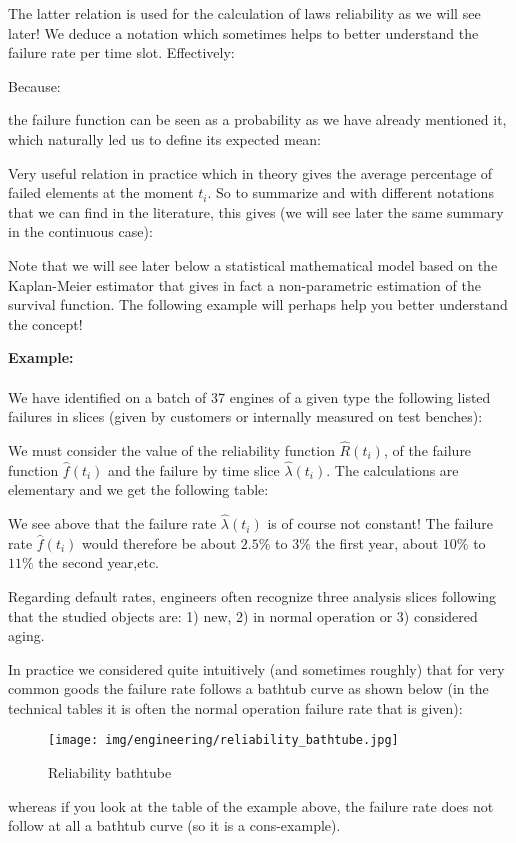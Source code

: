 	The latter relation is used for the calculation of laws reliability as we will see later! We deduce a notation which sometimes helps to better understand the failure rate per time slot. Effectively:
	
	Because:
	
	the failure function can be seen as a probability as we have already mentioned it, which naturally led us to define its expected mean:
	
	Very useful relation in practice which in theory gives the average percentage of failed elements at the moment $t_i$.
	\pagebreak
	So to summarize and with different notations that we can find in the literature, this gives (we will see later the same summary in the continuous case):
	\setlength\extrarowheight{12pt}
	
	\setlength\extrarowheight{0pt}
	Note that we will see later below a statistical mathematical model based on the Kaplan-Meier estimator that gives in fact a non-parametric estimation of the survival function. The following example will perhaps help you better understand the concept!
	\begin{tcolorbox}[colframe=black,colback=white,sharp corners]
	\textbf{{\Large {}}Example:}\\\\
	We have identified on a batch of 37 engines of a given type the following listed failures in slices (given by customers or internally measured on test benches):
	
	We must consider the value of the reliability function $\hat{R}(t_i)$, of the failure function $\hat{f}(t_i)$ and the failure by time slice $\hat{\lambda}(t_i)$. The calculations are elementary and we get the following table:
	
	We see above  that the failure rate $\hat{\lambda}(t_i)$ is of course not constant! The failure rate $\hat{f}(t_i)$ would therefore be about $2.5\%$ to $3\%$ the first year, about $10\%$ to $11\%$ the second year,etc.
	\end{tcolorbox}
	Regarding default rates, engineers often recognize three analysis slices following that the studied objects are: 1) new, 2) in normal operation or 3) considered aging.
	
	In practice we considered quite intuitively (and sometimes roughly) that for very common goods the failure rate follows a bathtub curve as shown below (in the technical tables it is often the normal operation failure rate that is given):
	
	\begin{figure}[H]
		\centering
		\texttt{[image: img/engineering/reliability\_bathtube.jpg]}
		\caption[]{Reliability bathtube}
	\end{figure}
	whereas if you look at the table of the example above, the failure rate does not follow at all a bathtub curve (so it is a cons-example).
	
